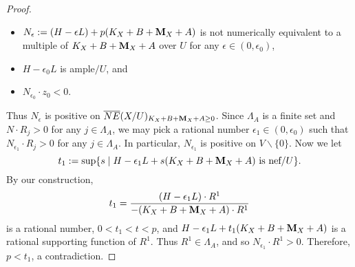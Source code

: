 \documentclass[11pt]{amsart}
\numberwithin{equation}{section}
\newcommand{\Mm}{{\bf{M}}}
\newcommand{\Qq}{\mathbb{Q}}
\newcommand{\cont}{\operatorname{cont}}
\newtheorem{lem}[thm]{Lemma}
\theoremstyle{definition}
\theoremstyle{definition}
\theoremstyle{definition}
\begin{document}
\begin{proof}
\begin{itemize}
    \item $N_{\epsilon}:=(H-\epsilon L)+p(K_X+B+\Mm_X+A)$ is not numerically equivalent to a multiple of $K_X+B+\Mm_X+A$ over $U$ for any $\epsilon\in (0,\epsilon_0)$,
    \item $H-\epsilon_0 L$ is ample$/U$, and
    \item $N_{\epsilon_0}\cdot z_0<0$.
\end{itemize}
Thus $N_{\epsilon}$ is positive on $\overline{NE}(X/U)_{K_X+B+\Mm_X+A\geq 0}$. Since $\Lambda_A$ is a finite set and $N\cdot R_j>0$ for any $j\in\Lambda_A$, we may pick a rational number $\epsilon_1\in (0,\epsilon_0)$ such that $N_{\epsilon_1}\cdot R_j>0$ for any $j\in\Lambda_A$. In particular, $N_{\epsilon_1}$ is positive on $V\backslash\{0\}$. Now we let
$$t_1:=\sup\{s\mid H-\epsilon_1L+s(K_X+B+\Mm_X+A)\text{ is nef}/U\}.$$
By our construction,
$$t_1=\frac{(H-\epsilon_1L)\cdot R^1}{-(K_X+B+\Mm_X+A)\cdot R^1}$$
is a rational number, $0<t_1<t<p$, and $H-\epsilon_1L+t_1(K_X+B+\Mm_X+A)$ is a rational supporting function of $R^1$. Thus $R^1\in\Lambda_A$, and so $N_{\epsilon_1}\cdot R^1>0$. Therefore, $p<t_1$, a contradiction.
\end{proof}

\begin{comment}
\begin{lem}\label{lem: gpair cone theorem spanned by extremal rays rational case}
Let $d\geq 2$ be an integer. Assume Theorem \ref{thm: cone theorem glc g-pairs} in dimension $\leq d-1$.

Let $(X,B,\Mm)/U$ be an NQC glc $\Qq$-g-pair of dimension $d$ and $\pi: X\rightarrow U$ the associated projective morphism. Let $A$ be an ample$/U$ $\Qq$-divisor on $X$ and $\{R_j\}_{j\in\Lambda_A}$ the set of $(K_X+B+\Mm_X+A)$-negative extremal rays in $\overline{NE}(X/U)$ that are rational. Then $\Lambda_A$ is a finite set, and
$$\overline{NE}(X/U)=\overline{NE}(X/U)_{K_X+B+\Mm_X+A\geq 0}+\sum_{j\in\Lambda_A}R_j.$$
In particular, any $(K_X+B+\Mm_X+A)$-negative extremal ray in $\overline{NE}(X/U)$ is rational.
\end{lem}
\begin{proof}
Let $F$ be a $(K_X+B+\Mm_X+A)$-negative extremal face in $\overline{NE}(X/U)$ that is rational and of dimension $\geq 2$. By Theorem \ref{thm: contraction theorem glc g-pairs}, there exists a contraction $\cont_F: X\rightarrow Y$ of $F$ over $U$. Let $\{G_j\}_{j\in\Lambda_F}$ be the rational proper $(K_X+B+\Mm_X+A)$-negative extremal faces in $\overline{NE}(X/Y)$, then $\Lambda_F$ is a finite set for each $F$, and
$$\overline{NE}(X/Y)=\sum_{j\in\Lambda_F}G_j.$$
Each $G_j$ is also a $(K_X+B+\Mm_X+A)$-negative extremal face in $\overline{NE}(X/U)$, and $\dim G_j<\dim F$ for any $F$. By induction on the dimension of extremal faces and Lemma \ref{lem: gpair cone theorem spanned by extremal faces rational case}, we get the desired result.
\end{proof}
\end{comment}
\end{document}
